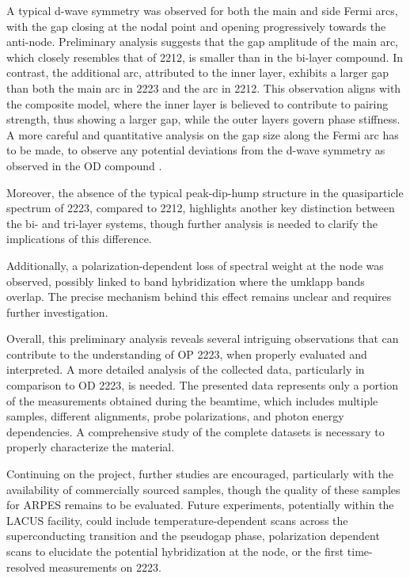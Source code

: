 A typical d-wave symmetry was observed for both the main and side Fermi arcs, with the gap closing at the nodal point and opening progressively towards the anti-node.
Preliminary analysis suggests that the gap amplitude of the main arc, which closely resembles that of 2212, is smaller than in the bi-layer compound.
In contrast, the additional arc, attributed to the inner  layer, exhibits a larger gap than both the main arc in 2223 and the arc in 2212.
This observation aligns with the composite model, where the inner layer is believed to contribute to pairing strength, thus showing a larger gap, while the outer layers govern phase stiffness.
A more careful and quantitative analysis on the gap size along the Fermi arc has to be made, to observe any potential deviations from the d-wave symmetry as observed in the OD compound \cite{luo_electronic_2023}.

Moreover, the absence of the typical peak-dip-hump structure in the quasiparticle spectrum of 2223, compared to 2212, highlights another key distinction between the bi- and tri-layer systems, though further analysis is needed to clarify the implications of this difference.

Additionally, a polarization-dependent loss of spectral weight at the node was observed, possibly linked to band hybridization where the umklapp bands overlap.
The precise mechanism behind this effect remains unclear and requires further investigation.

Overall, this preliminary analysis reveals several intriguing observations that can contribute to the understanding of OP 2223, when properly evaluated and interpreted.
A more detailed analysis of the collected data, particularly in comparison to OD 2223, is needed.
The presented data represents only a portion of the measurements obtained during the beamtime, which includes multiple samples, different alignments, probe polarizations, and photon energy dependencies.
A comprehensive study of the complete datasets is necessary to properly characterize the material.

Continuing on the project, further studies are encouraged, particularly with the availability of commercially sourced samples, though the quality of these samples for ARPES remains to be evaluated.
Future experiments, potentially within the LACUS facility, could include temperature-dependent scans across the superconducting transition and the pseudogap phase, polarization dependent scans to elucidate the potential hybridization at the node, or the first time-resolved measurements on 2223.